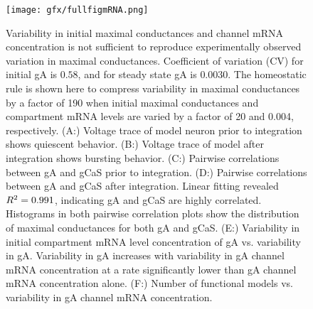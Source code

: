 \begin{figure}[H]
	\centering
	\begin{addmargin}[-2cm]{-3cm}
	\texttt{[image: gfx/fullfigmRNA.png]}
	\end{addmargin}
\caption[Variability in initial maximal conductances and mRNA levels under integral control.]{Variability in initial maximal conductances and channel mRNA concentration is not sufficient to reproduce experimentally observed variation in maximal conductances. Coefficient of variation (CV) for initial \ac{gA} is $0.58$, and for steady state \ac{gA} is $0.0030$. The homeostatic rule is shown here to compress variability in maximal conductances by a factor of 190 when initial maximal conductances and compartment mRNA levels are varied by a factor of 20 and 0.004, respectively. (\textsc{A:}) Voltage trace of model neuron prior to integration shows quiescent behavior. (\textsc{B:}) Voltage trace of model after integration shows bursting behavior. (\textsc{C:}) Pairwise correlations between \ac{gA} and \ac{gCaS} prior to integration. (\textsc{D:}) Pairwise correlations between \ac{gA} and \ac{gCaS} after integration. Linear fitting revealed \(R\textsuperscript{2} = 0.991\), indicating \ac{gA} and \ac{gCaS} are highly correlated. Histograms in both pairwise correlation plots show the distribution of maximal conductances for both \ac{gA} and \ac{gCaS}. (\textsc{E:}) Variability in initial compartment mRNA level concentration of \ac{gA} vs. variability in \ac{gA}. Variability in \ac{gA} increases with variability in \ac{gA} channel mRNA concentration at a rate significantly lower than \ac{gA} channel mRNA concentration  alone. (\textsc{F:}) Number of functional models vs. variability in \ac{gA} channel mRNA concentration.}
\label{fig:integralvariation_g0}
\end{figure}

